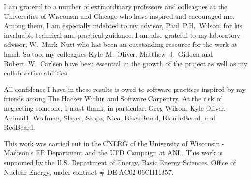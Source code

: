 I am grateful to a number of extraordinary professors and colleagues at the 
Universities of Wisconsin and Chicago who have inspired and encouraged me. 
Among  them, I am especially indebted to my advisor, Paul~P.H.~Wilson, for his 
invaluable technical and practical guidance. I am also grateful to my 
laboratory advisor, W.~Mark~Nutt who has been an outstanding resource for the 
work at hand. So too, my colleagues Kyle~M.~Oliver, Matthew~J.~Gidden and 
Robert~W.~Carlsen have been essential in the growth of the \Cyclus project as 
well as my collaborative abilities.

All confidence I have in these results is owed to software practices inspired 
by my friends among The Hacker Within and Software Carpentry. At the risk of 
neglecting someone, I must thank, in particular, Greg Wilson, Kyle Oliver, 
Animal1, Wolfman, Slayer, Scopz, Nico,  BlackBeard, BlondeBeard, and RedBeard.

This work was carried out in the \gls{CNERG} of the University of Wisconsin - 
Madison's \gls{EP} Department and the \gls{UFD} Campaign at \gls{ANL}. This 
work is supported by the U.S. Department of Energy, Basic Energy Sciences, 
Office of Nuclear Energy, under contract \# DE-AC02-06CH11357.
